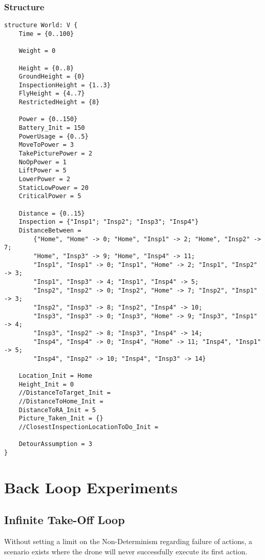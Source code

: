 \documentclass[12pt]{extarticle}
\begin{document}
\subsubsection*{Structure}
\begin{lstlisting}[basicstyle=\tiny]
structure World: V {
    Time = {0..100}
    
    Weight = 0
    
    Height = {0..8}
    GroundHeight = {0}
    InspectionHeight = {1..3}
    FlyHeight = {4..7}
    RestrictedHeight = {8}
    
    Power = {0..150}
    Battery_Init = 150
    PowerUsage = {0..5}
    MoveToPower = 3
    TakePicturePower = 2
    NoOpPower = 1
    LiftPower = 5
    LowerPower = 2
    StaticLowPower = 20
    CriticalPower = 5
    
    Distance = {0..15}
    Inspection = {"Insp1"; "Insp2"; "Insp3"; "Insp4"}
    DistanceBetween =
    	{"Home", "Home" -> 0; "Home", "Insp1" -> 2; "Home", "Insp2" -> 7;
    	"Home", "Insp3" -> 9; "Home", "Insp4" -> 11;
        "Insp1", "Insp1" -> 0; "Insp1", "Home" -> 2; "Insp1", "Insp2" -> 3;
        "Insp1", "Insp3" -> 4; "Insp1", "Insp4" -> 5;
    	"Insp2", "Insp2" -> 0; "Insp2", "Home" -> 7; "Insp2", "Insp1" -> 3;
    	"Insp2", "Insp3" -> 8; "Insp2", "Insp4" -> 10;
    	"Insp3", "Insp3" -> 0; "Insp3", "Home" -> 9; "Insp3", "Insp1" -> 4;
    	"Insp3", "Insp2" -> 8; "Insp3", "Insp4" -> 14;
        "Insp4", "Insp4" -> 0; "Insp4", "Home" -> 11; "Insp4", "Insp1" -> 5;
        "Insp4", "Insp2" -> 10; "Insp4", "Insp3" -> 14}
    
    Location_Init = Home
    Height_Init = 0
    //DistanceToTarget_Init =
    //DistanceToHome_Init =
    DistanceToRA_Init = 5
    Picture_Taken_Init = {}
    //ClosestInspectionLocationToDo_Init =
    
    DetourAssumption = 3
}
\end{lstlisting}
\section{Back Loop Experiments}
\subsection{Infinite Take-Off Loop}
\label{app:strucinfinitetakeoff}
Without setting a limit on the Non-Determinism regarding failure of actions, a scenario exists where the drone will never successfully execute its first action.
\end{document}
